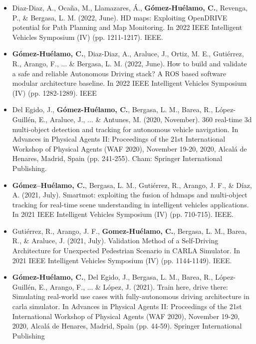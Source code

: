 \begin{refsection}
\begin{itemize}
\item Diaz-Diaz, A., Ocaña, M., Llamazares, Á., \textbf{Gómez-Huélamo, C.}, Revenga, P., \& Bergasa, L. M. (2022, June). HD maps: Exploiting OpenDRIVE potential for Path Planning and Map Monitoring. In 2022 IEEE Intelligent Vehicles Symposium (IV) (pp. 1211-1217). IEEE.

\item \textbf{Gómez-Huélamo, C.}, Diaz-Diaz, A., Araluce, J., Ortiz, M. E., Gutiérrez, R., Arango, F., ... \& Bergasa, L. M. (2022, June). How to build and validate a safe and reliable Autonomous Driving stack? A ROS based software modular architecture baseline. In 2022 IEEE Intelligent Vehicles Symposium (IV) (pp. 1282-1289). IEEE

\item Del Egido, J., \textbf{Gómez-Huélamo, C.}, Bergasa, L. M., Barea, R., López-Guillén, E., Araluce, J., ... \& Antunes, M. (2020, November). 360 real-time 3d multi-object detection and tracking for autonomous vehicle navigation. In Advances in Physical Agents II: Proceedings of the 21st International Workshop of Physical Agents (WAF 2020), November 19-20, 2020, Alcalá de Henares, Madrid, Spain (pp. 241-255). Cham: Springer International Publishing.

\item \textbf{Gómez–Huélamo, C.}, Bergasa, L. M., Gutiérrez, R., Arango, J. F., \& Díaz, A. (2021, July). Smartmot: exploiting the fusion of hdmaps and multi-object tracking for real-time scene understanding in intelligent vehicles applications. In 2021 IEEE Intelligent Vehicles Symposium (IV) (pp. 710-715). IEEE.

\item Gutiérrez, R., Arango, J. F., \textbf{Gomez-Huélamo, C.}, Bergasa, L. M., Barea, R., \& Araluce, J. (2021, July). Validation Method of a Self-Driving Architecture for Unexpected Pedestrian Scenario in CARLA Simulator. In 2021 IEEE Intelligent Vehicles Symposium (IV) (pp. 1144-1149). IEEE.

\item \textbf{Gómez-Huélamo, C.}, Del Egido, J., Bergasa, L. M., Barea, R., López-Guillén, E., Arango, F., ... \& López, J. (2021). Train here, drive there: Simulating real-world use cases with fully-autonomous driving architecture in carla simulator. In Advances in Physical Agents II: Proceedings of the 21st International Workshop of Physical Agents (WAF 2020), November 19-20, 2020, Alcalá de Henares, Madrid, Spain (pp. 44-59). Springer International Publishing


\end{itemize}
\end{refsection}
